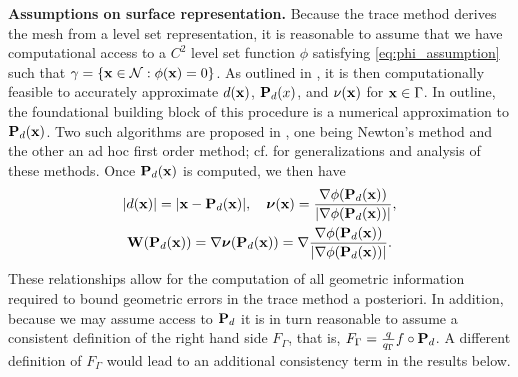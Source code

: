 {\bf Assumptions on surface representation.}  
Because the trace method derives the mesh from a level set representation, it is reasonable to assume that we have computational access to a $C^2$ level set function $\phi$ satisfying \eqref{eq:phi_assumption} such that $\gamma=\{{\bf x}\in\mathcal{N}: \phi({\bf x})=0\}$.  As outlined in \cite{DemlowDziuk:07}, it is then computationally feasible to accurately approximate $d({\bf x})$, ${\bf P}_d(x)$, and $\nu({\bf x})$ for ${\bf x} \in \Gamma$.  In outline, the foundational building block of this procedure is a numerical approximation to ${\bf P}_d({\bf x})$.  Two such algorithms are proposed in \cite{DemlowDziuk:07}, one being Newton's method and the other an ad hoc first order method; cf. \cite{Gr17} for generalizations and analysis of these methods.  Once ${\bf P}_d({\bf x})$ is computed, we then have
%
\begin{gather*}
|d({\bf x})| = |{\bf x} - {\bf P}_d({\bf x})|,
\quad {\boldsymbol \nu}({\bf x})= \frac{\nabla \phi({\bf P}_d({\bf x}))}{|\nabla \phi({\bf P}_d({\bf x}))|},
\\
{\bf W}({\bf P}_d({\bf x}))=\nabla {\boldsymbol \nu} ({\bf P}_d({\bf x}))= \nabla \frac{\nabla \phi({\bf P}_d({\bf x}))}{|\nabla \phi({\bf P}_d({\bf x}))|}.
\end{gather*}
%
These relationships allow for the computation of all geometric information required to bound geometric errors in the trace method a posteriori.  In addition, because we may assume access to ${\bf P}_d$ it is in turn reasonable to assume a consistent definition of the right hand side $F_\Gamma$, that is, $F_\Gamma = \frac{q}{q_\Gamma} f \circ {\bf P}_d$.  A different definition of $F_\Gamma$ would lead to an additional consistency term in the results below.  

\fi

